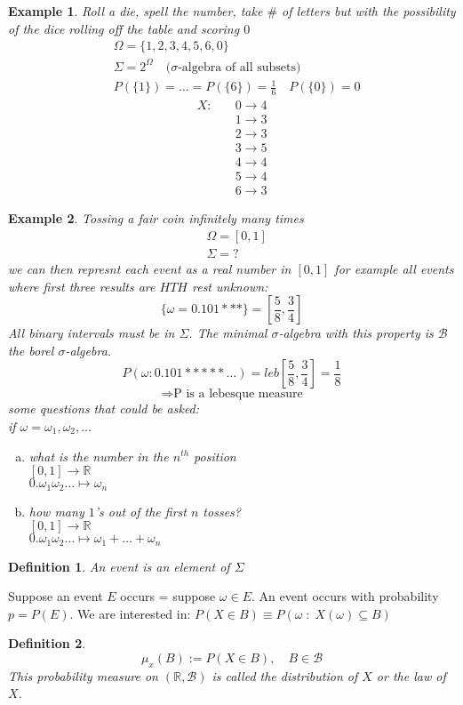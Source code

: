 \documentclass[12pt]{article}
\def\RR{\mathbb{R}}
\newtheorem{definition}{Definition}[section]
\newtheorem{example}{Example}[section]
\begin{document}
\begin{example}
Roll a die, spell the number, take $\#$ of letters but with the possibility of the dice rolling off the table and scoring $0$
\begin{align*}
&\Omega = \{1,2,3,4,5,6,0\}\\
&\Sigma = 2^{\Omega} \quad \text{($\sigma$-algebra of all subsets)}\\
&P(\{1\})= \dots =P(\{6\}) = \frac{1}{6} \quad 
P(\{0\}) = 0
\end{align*}
\begin{align*}
X:\quad  &0\rightarrow 4\\
&1\rightarrow 3\\
&2\rightarrow 3\\
&3\rightarrow 5\\
&4\rightarrow 4\\
&5\rightarrow 4\\
&6\rightarrow 3
\end{align*}
\end{example}

\begin{example}
Tossing a fair coin infinitely many times
\begin{align*}
&\Omega = [0,1]\\
&\Sigma = ?
\end{align*}
we can then represnt each event as a real number in $[0,1]$ for example all events where first three results are $HTH$ rest unknown:
\[\{\omega = 0.101***\} = \left[\frac{5}{8} , \frac{3}{4}\right] \]
All binary intervals must be in $\Sigma$. The minimal $\sigma$-algebra with this property is $\mathcal{B}$ the borel $\sigma$-algebra. 
\[P(\omega : 0.101*****\dots ) = leb\left[\frac{5}{8}, \frac{3}{4}\right] = \frac{1}{8}\]
\[\Rightarrow \text{P is a lebesque measure}\]
some questions that could be asked:\\
if $\omega = \omega_1, \omega_2 , \dots$
\begin{enumerate}[(a)]
\item what is the number in the $n^{th}$ position\\
$[0,1] \rightarrow \RR$\\
$0.\omega_1 \omega_2 \dots \mapsto  \omega_n$
\item how many $1$'s out of the first $n$ tosses?\\
$[0,1] \rightarrow \RR$\\
$0.\omega_1 \omega_2 \dots \mapsto \omega_1 + \dots + \omega_n$
\end{enumerate}
\end{example}

\begin{definition}
An event is an element of $\Sigma$
\end{definition}
Suppose an event $E$ occurs = suppose $\omega \in E$. An event occurs with probability $p= P(E)$. We are interested in: $P(X \in B) \equiv P(\omega \;:\;X(\omega) \subseteq B)$
\begin{definition}
\[\mu_x(B) := P(X\in B), \quad B \in \mathcal{B}\]
This probability measure on $(\RR , \mathcal{B})$ is called the distribution of $X$ or the law of $X$.
\end{definition}
\end{document}
